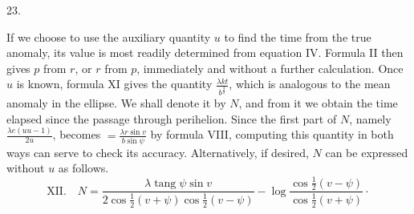 \par{}
\begin{center}
23.
\end{center}
If we choose to use the auxiliary quantity $u$ to find the time from the true anomaly, its value is most readily determined from equation IV. Formula II then gives $p$ from $r$, or $r$ from $p$, immediately and without a further calculation. Once $u$ is known, formula XI gives the quantity $\frac{\lambda k t}{b^{\frac{3}{2}}}$, which is analogous to the mean anomaly in the ellipse. We shall denote it by $N$, and from it we obtain the time elapsed since the passage through perihelion. Since the first part of $N$, namely $\frac{\lambda e(u u-1)}{2u}$, becomes $=\frac{\lambda r\sin v}{b\sin\psi}$ by formula VIII, computing this quantity in both ways can serve to check its accuracy. Alternatively, if desired, $N$ can be expressed without $u$ as follows.
\[
\mathrm{XII.}\quad N=\frac{\lambda\operatorname{tang}\psi\sin v}{2\cos\frac{1}{2}(v+\psi)\cos\frac{1}{2}(v-\psi)}-\log\frac{\cos\frac{1}{2}(v-\psi)}{\cos\frac{1}{2}(v+\psi)}\cdot
\]

